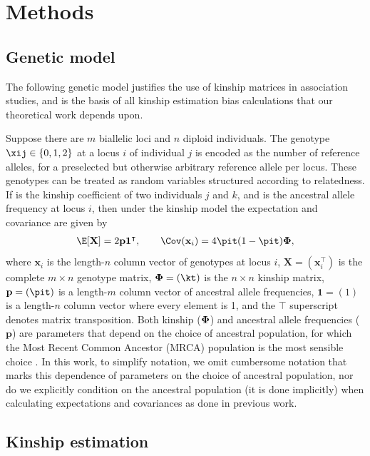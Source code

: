 \documentclass[11pt]{article}
\newcommand{\kinMat}{%
  \ensuremath{%
    \mathbf{\Phi}
  }%
  \xspace%
}%
\begin{document}
\section{Methods}

\subsection{Genetic model}

The following genetic model justifies the use of kinship matrices in association studies, and is the basis of all kinship estimation bias calculations that our theoretical work depends upon.

Suppose there are $m$ biallelic loci and $n$ diploid individuals.
The genotype $\xij \in \{0,1,2\}$ at a locus $i$ of individual $j$ is encoded as the number of reference alleles, for a preselected but otherwise arbitrary reference allele per locus.
These genotypes can be treated as random variables structured according to relatedness.
If \kt is the kinship coefficient of two individuals $j$ and $k$, and \pit is the ancestral allele frequency at locus $i$, then under the kinship model \citep{ochoa_estimating_2021} the expectation and covariance are given by
\begin{align*}
  \E[\mathbf{X}]
  =
    2 \mathbf{p} \mathbf{1}^\intercal
  ,
  \quad\quad
  \Cov(\mathbf{x}_i)
  =
    4 \pit (1-\pit) \kinMat
    ,
\end{align*}
where $\mathbf{x}_i$ is the length-$n$ column vector of genotypes at locus $i$, $\mathbf{X} = (\mathbf{x}_i^\intercal)$ is the complete $m \times n$ genotype matrix, $\kinMat = (\kt)$ is the $n \times n$ kinship matrix, $\mathbf{p} = (\pit)$ is a length-$m$ column vector of ancestral allele frequencies, $\mathbf{1} = (1)$ is a length-$n$ column vector where every element is 1, and the $\intercal$ superscript denotes matrix transposition.
Both kinship ($\kinMat$) and ancestral allele frequencies ($\mathbf{p}$) are parameters that depend on the choice of ancestral population, for which the Most Recent Common Ancestor (MRCA) population is the most sensible choice \citep{ochoa_estimating_2021}.
In this work, to simplify notation, we omit cumbersome notation that marks this dependence of parameters on the choice of ancestral population, nor do we explicitly condition on the ancestral population (it is done implicitly) when calculating expectations and covariances as done in previous work.

\subsection{Kinship estimation}
\end{document}
